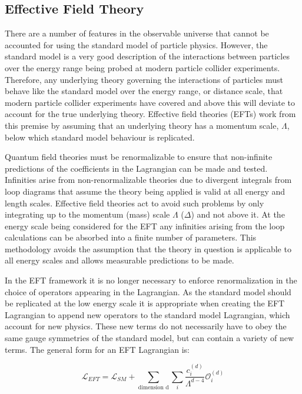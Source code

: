 \subsection{Effective Field Theory}
There are a number of features in the observable universe that cannot be accounted for using the standard model of particle physics.  However, the standard model is a very good description of the interactions between particles over the energy range being probed at modern particle collider experiments.  Therefore, any underlying theory governing the interactions of particles must behave like the standard model over the energy range, or distance scale, that modern particle collider experiments have covered and above this will deviate to account for the true underlying theory.  Effective field theories (EFTs) work from this premise by assuming that an underlying theory has a momentum scale, $\Lambda$, below which standard model behaviour is replicated.  

Quantum field theories must be renormalizable to ensure that non-infinite predictions of the coefficients in the Lagrangian can be made and tested.  Infinities arise from non-renormalizable theories due to divergent integrals from loop diagrams that assume the theory being applied is valid at all energy and length scales.  Effective field theories act to avoid such problems by only integrating up to the momentum (mass) scale $\Lambda$ ($\Delta$) and not above it.  At the energy scale being considered for the EFT any infinities arising from the loop calculations can be absorbed into a finite number of parameters.  This methodology avoids the assumption that the theory in question is applicable to all energy scales and allows measurable predictions to be made.  

In the EFT framework it is no longer necessary to enforce renormalization in the choice of operators appearing in the Lagrangian.  As the standard model should be replicated at the low energy scale it is appropriate when creating the EFT Lagrangian to append new operators to the standard model Lagrangian, which account for new physics.  These new terms do not necessarily have to obey the same gauge symmetries of the standard model, but can contain a variety of new terms.  The general form for an EFT Lagrangian is:

\begin{equation}
\mathcal{L}_{EFT} = \mathcal{L}_{SM} + \sum_{\text{dimension d}} \sum_{i} \frac{c_{i}^{(d)}}{\Lambda^{d-4}} \mathcal{O}_{i}^{(d)}
\end{equation}

